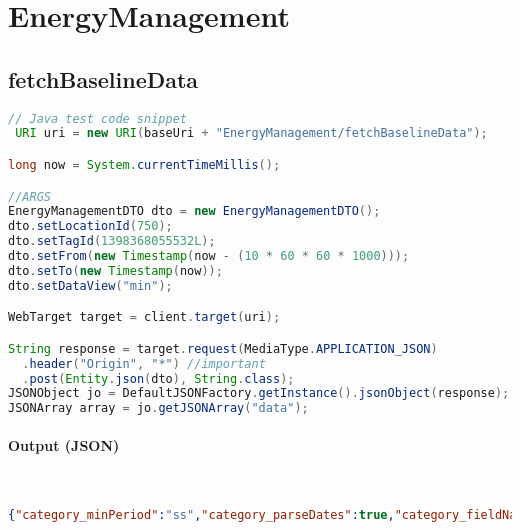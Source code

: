 \documentclass[
10pt, %
letterpaper, %
oneside, %
headinclude,footinclude, %
BCOR5mm, %
]{scrartcl}
\begin{document}
\section{EnergyManagement}


\subsection{\textbf{fetchBaselineData}}

\begin{lstlisting}[language=Java]
// Java test code snippet
 URI uri = new URI(baseUri + "EnergyManagement/fetchBaselineData");

long now = System.currentTimeMillis();

//ARGS
EnergyManagementDTO dto = new EnergyManagementDTO();
dto.setLocationId(750);
dto.setTagId(1398368055532L);
dto.setFrom(new Timestamp(now - (10 * 60 * 60 * 1000)));
dto.setTo(new Timestamp(now));
dto.setDataView("min");

WebTarget target = client.target(uri);

String response = target.request(MediaType.APPLICATION_JSON)
  .header("Origin", "*") //important
  .post(Entity.json(dto), String.class);
JSONObject jo = DefaultJSONFactory.getInstance().jsonObject(response);
JSONArray array = jo.getJSONArray("data");        
\end{lstlisting}

\paragraph{Output (JSON)} ~
\begin{lstlisting}[language=json]
{"category_minPeriod":"ss","category_parseDates":true,"category_fieldName":"x","data":[{"y01":377292.4484375,"y02":438328.259375,"y00":309420.7078125,"x":1404372060000},{"y01":377292.4484375,"y02":438328.259375,"y00":309420.7078125,"x":1404372120000},{"y01":377292.4484375,"y02":438328.259375,"y00":309420.7078125,"x":1404372180000},{"y01":377292.4484375,"y02":438328.259375,"y00":309420.7078125,"x":1404372240000},{"y01":377292.4484375,"y02":438328.259375,"y00":309420.7078125,"x":1404372300000},{"y01":377292.4484375,"y02":438328.259375,"y00":309420.7078125,"x":1404372360000},{"y01":377292.4484375,"y02":438328.259375,"y00":309420.7078125,"x":1404372420000}....}
\end{lstlisting}

\end{document}
